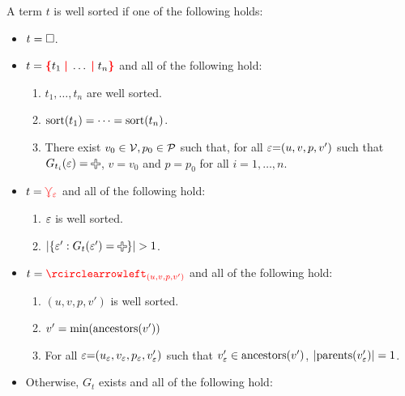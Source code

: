 \begin{definition}
  A term $t$ is well sorted if one of the following holds:
  \begin{itemize}
    \item $t = \square$.
    \item $t = \conflictHole{t_1, \ldots, t_n}$ and all of the following hold:
      \begin{enumerate}
        \item $t_1, \ldots, t_n$ are well sorted.
        \item $\operatorname{\text{sort}}\mathopen{}\left(t_1\right)\mathclose{} = \cdots = \operatorname{\text{sort}}\mathopen{}\left(t_n\right)\mathclose{}$.
        \item
          There exist $v_0 \in \mathcal{V}, p_0 \in \mathcal{P}$ such that,
          for all $\varepsilon{=}(u, v, p, v')$ such that $G_{t_i}(\e) = \Plus$,
          $v = v_0$ and $p = p_0$ for all $i = 1, \ldots, n$.
      \end{enumerate}
    \item $t = \textcolor{red}{\curlyveedownarrow_{\varepsilon}}$ and all of the following hold:
      \begin{enumerate}
        \item $\varepsilon$ is well sorted.
        \item $\SizeOf{\SetOf{\e' \SuchThat{G_t(\e') = \Plus}}} > 1$.
      \end{enumerate}
    \item $t = \cycleVertex{(u, v, p, v')}$ and all of the following hold:
      \begin{enumerate}
        \item $(u, v, p, v')$ is well sorted.
        \item $v' = \operatorname{\text{min}}\mathopen{}\left(\operatorname{\text{ancestors}}\mathopen{}\left(v'\right)\mathclose{}\right)\mathclose{}$
        \item For all $\varepsilon{=}(u_{\varepsilon}, v_{\varepsilon}, p_{\varepsilon}, v_{\varepsilon}')$
          such that $v_{\varepsilon}' \in \operatorname{\text{ancestors}}\mathopen{}\left(v'\right)\mathclose{}$,
          $\left\lvert\operatorname{\text{parents}}\mathopen{}\left(v_{\varepsilon}'\right)\mathclose{}\right\rvert = 1$.
      \end{enumerate}
    \item Otherwise, $G_t$ exists and all of the following hold:

\end{itemize}
\end{definition}
